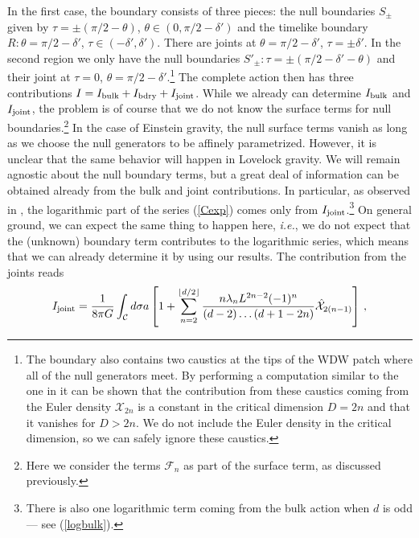 \documentclass[11pt,letterpaper]{article}
\begin{document}
In the first case, the boundary consists of three pieces: the null boundaries $S_{\pm}$ given by $\tau=\pm(\pi/2-\theta)$, $\theta\in(0,\pi/2-\delta')$ and the timelike boundary $R: \theta=\pi/2-\delta'$, $\tau\in(-\delta',\delta')$. There are joints at $\theta=\pi/2-\delta'$, $\tau=\pm \delta'$. In the second region we only have the null boundaries $S'_{\pm}: \tau=\pm(\pi/2-\delta'-\theta)$ and their joint at $\tau=0$, $\theta=\pi/2-\delta'$.\footnote{The boundary also contains two caustics at the tips of the WDW patch where all of the null generators meet. By performing a computation similar to the one in \cite{Chapman:2016hwi} it can be shown that the contribution from these caustics coming from the Euler density $\mathcal{X}_{2n}$ is a constant in the critical dimension $D=2n$ and that it vanishes for $D>2n$. We do not include the Euler density in the critical dimension, so we can safely ignore these caustics.} The complete action then has three contributions $I=I_{\rm bulk}+I_{\rm bdry}+I_{\rm joint}$. While we already can determine $I_{\rm bulk}$ and $I_{\rm joint}$, the problem is of course that we do not know the surface terms for null boundaries.\footnote{Here we consider the terms $\mathcal{F}_n$ as part of the surface term, as discussed previously.} In the case of Einstein gravity, the null surface terms vanish as long as we choose the null generators to be affinely parametrized. However, it is unclear that the same behavior will happen in Lovelock gravity. We will remain agnostic about the null boundary terms, but a great deal of information can be obtained already from the bulk and joint contributions. In particular, as observed in \cite{Carmi:2016wjl}, the logarithmic part of the series (\ref{Cexp}) comes only from $I_{\rm joint}$.\footnote{There is also one logarithmic term coming from the bulk action when $d$ is odd --- see (\ref{logbulk}).} On general ground, we can expect the same thing to happen here, \textit{i.e.}, we do not expect that the (unknown) boundary term contributes to the logarithmic series, which means that we can already determine it by using our results. The contribution from the joints reads
\begin{equation}
I_{\rm joint}=\frac{1}{8\pi G}\int_{\mathcal{C}}d\sigma a \left[1+\sum_{n=2}^{\lfloor d/2\rfloor}\frac{n \lambda_n L^{2n-2}(-1)^{n}}{(d-2)\ldots(d+1-2n)}\hat{\mathcal{X}}_{2(n-1)}\right]\, ,
\end{equation}
\end{document}
